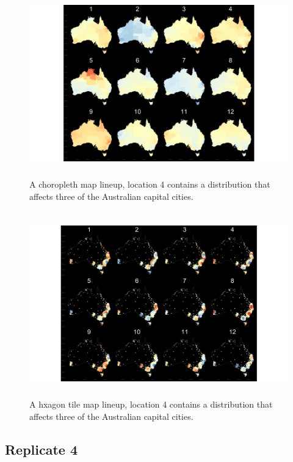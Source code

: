 \documentclass{monashthesis}
\begin{document}
\begin{figure}[H]
\centering
\includegraphics[height=8cm]{lineups/three-geo8-1.pdf}
\caption{\label{fig:three-geo8}A choropleth map lineup, location 4 contains a distribution that affects three of the Australian capital cities.}
\end{figure}

\begin{figure}[H]
\centering
\includegraphics[height=8cm]{lineups/three-hex8-1.pdf}
\caption{\label{fig:three-hex8}A hxagon tile map lineup, location 4 contains a distribution that affects three of the Australian capital cities.}
\end{figure}

\hypertarget{replicate-4-1}{%
\subsection{Replicate 4}\label{replicate-4-1}}
\end{document}
